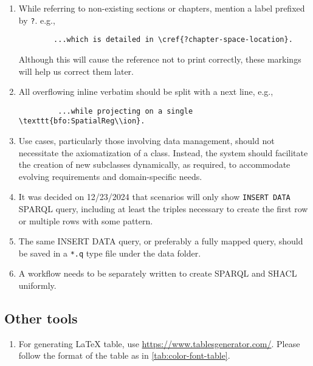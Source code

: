 \begin{enumerate}
    \item While referring to non-existing sections or chapters, mention a label prefixed by \texttt{?}. e.g.,
    \begin{verbatim}
        ...which is detailed in \cref{?chapter-space-location}. 
    \end{verbatim}
    Although this will cause the reference not to print correctly, these markings will help us correct them later. 
    
    \item All overflowing inline verbatim should be split with a next line, e.g.,
    \begin{verbatim}
         ...while projecting on a single \texttt{bfo:SpatialReg\\ion}.
    \end{verbatim}

    \item  Use cases, particularly those involving data management, should not necessitate the axiomatization of a class. Instead, the system should facilitate the creation of new subclasses dynamically, as required, to accommodate evolving requirements and domain-specific needs.

    \item It was decided on 12/23/2024 that scenarios will only show \texttt{INSERT DATA} SPARQL query, including at least the triples necessary to create the first row or multiple rows with some pattern. 

        \item The same INSERT DATA query, or preferably a fully mapped query, should be saved in a \texttt{*.q} type file under the data folder.

    \item A workflow needs to be separately written to create SPARQL and SHACL uniformly.     
 \end{enumerate}

\subsection*{Other tools}
\begin{enumerate}
    \item For generating \LaTeX\xspace table, use \href{Table Genrator}{https://www.tablesgenerator.com/}. Please follow the format of the table as in \cref{tab:color-font-table}.
\end{enumerate}
